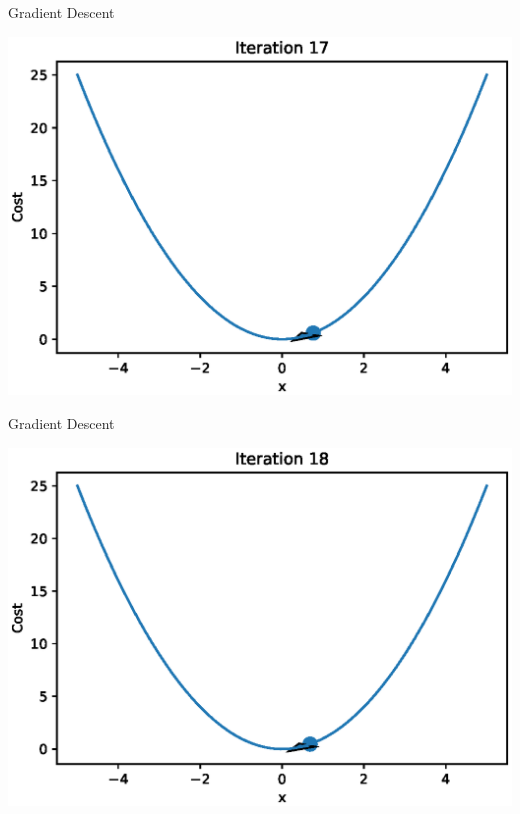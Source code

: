 \documentclass{beamer}
\begin{document}
\begin{frame}{Gradient Descent}
  \begin{center}
       \includegraphics[totalheight=6cm]{gradient-descent/iteration-17.eps}
   \end{center}
\end{frame}

\begin{frame}{Gradient Descent}
  \begin{center}
       \includegraphics[totalheight=6cm]{gradient-descent/iteration-18.eps}
   \end{center}
\end{frame}
\end{document}

